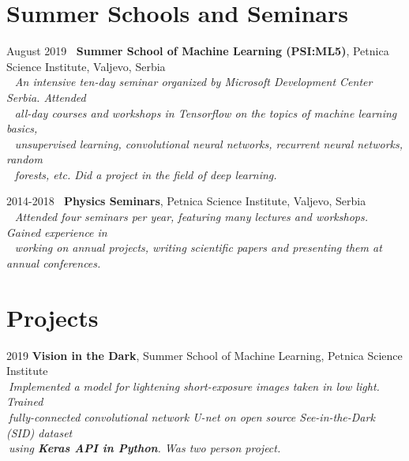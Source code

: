 \documentclass[10pt]{article}
\begin{document}
\begin{comment}
\tabbedblock
{
2012-2014 \> $\:$ \textbf{Primary school at Mathematical Grammar School}, Belgrade, Serbia\\[2pt]
\>\+
$\:$ $\:$\textit{Attended $7^{th}$ and $8^{th}$ grades of primary school in special primary school classes}
}
\end{comment}

\section{Summer Schools and Seminars}

\tabbedblock
{
August 2019 \> $\:$ \textbf{Summer School of Machine Learning (PSI:ML5)}, Petnica Science Institute, Valjevo, Serbia\\[2pt]
\>\+
$\:$ $\:$\textit{An intensive ten-day seminar organized by Microsoft Development Center Serbia. Attended} \\
$\:$ $\:$\textit{all-day courses and workshops in Tensorflow on the topics of machine learning basics, } \\
$\:$ $\:$\textit{unsupervised learning, convolutional neural networks, recurrent neural networks, random} \\
$\:$ $\:$\textit{forests, etc. Did a project in the field of deep learning.}
}

\tabbedblock
{
2014-2018  \> $\:$ \textbf{Physics Seminars}, Petnica Science Institute, Valjevo, Serbia\\[2pt]
\>\+
$\:$ $\:$\textit{Attended four seminars per year, featuring many lectures and workshops. Gained experience in}\\
$\:$ $\:$\textit{working on annual projects, writing scientific papers and presenting them at annual conferences.}
}


\section{Projects}

\tabbedblock
{
2019 \> \textbf{Vision in the Dark}, Summer School of Machine Learning, Petnica Science Institute\\[2pt]
\>\+
$\:$\textit{Implemented a model for lightening short-exposure images taken in low light. Trained } \\
$\:$\textit{fully-connected convolutional network U-net on open source See-in-the-Dark (SID) dataset } \\
$\:$\textit{using \textbf{Keras API in Python}. Was two person project.}
}
\end{document}
